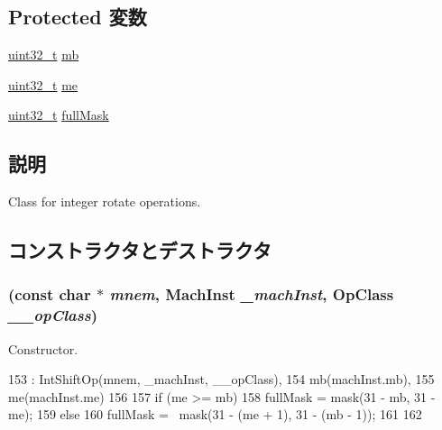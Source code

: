\subsection*{Protected 変数}
\begin{DoxyCompactItemize}
\item 
\hyperlink{Type_8hh_a435d1572bf3f880d55459d9805097f62}{uint32\_\-t} \hyperlink{classPowerISA_1_1IntRotateOp_a3e190bd2b8ef0f37555b4d70d783b479}{mb}
\item 
\hyperlink{Type_8hh_a435d1572bf3f880d55459d9805097f62}{uint32\_\-t} \hyperlink{classPowerISA_1_1IntRotateOp_aa54fd7dc50062b9688eb7e2df5e520f0}{me}
\item 
\hyperlink{Type_8hh_a435d1572bf3f880d55459d9805097f62}{uint32\_\-t} \hyperlink{classPowerISA_1_1IntRotateOp_aa713b7e82b23f1283790e4f19b5606dc}{fullMask}
\end{DoxyCompactItemize}


\subsection{説明}
Class for integer rotate operations. 

\subsection{コンストラクタとデストラクタ}
\hypertarget{classPowerISA_1_1IntRotateOp_a77085b4707de2530c85e43f9804322aa}{
\subsubsection[{IntRotateOp}]{ (const char $\ast$ {\em mnem}, \/  {\bf MachInst} {\em \_\-machInst}, \/  OpClass {\em \_\-\_\-opClass})}}
\label{classPowerISA_1_1IntRotateOp_a77085b4707de2530c85e43f9804322aa}


Constructor. 


\begin{DoxyCode}
153       : IntShiftOp(mnem, _machInst, __opClass),
154         mb(machInst.mb),
155         me(machInst.me)
156     {
157         if (me >= mb) {
158             fullMask = mask(31 - mb, 31 - me);
159         } else {
160             fullMask = ~mask(31 - (me + 1), 31 - (mb - 1));
161         }
162     }
\end{DoxyCode}


